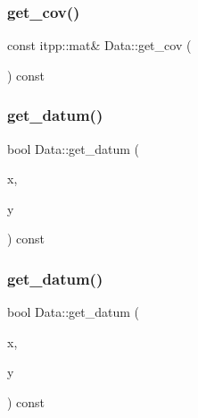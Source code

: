 \mbox{\label{classData_a19b920edbea6526f6db747bfe1c4c1c2}} 
\subsubsection{\texorpdfstring{get\_cov()}{get\_cov()}\hspace{0.1cm}{\footnotesize\ttfamily [2/2]}}
{\footnotesize\ttfamily const itpp\+::mat\& Data\+::get\+\_\+cov (\begin{DoxyParamCaption}{ }\end{DoxyParamCaption}) const\hspace{0.3cm}{\ttfamily [inline]}}

\mbox{\label{classData_ad7e50542712441af6ad2a227193a777f}} 
\subsubsection{\texorpdfstring{get\_datum()}{get\_datum()}\hspace{0.1cm}{\footnotesize\ttfamily [1/4]}}
{\footnotesize\ttfamily bool Data\+::get\+\_\+datum (\begin{DoxyParamCaption}\item[{\mbox{\hyperlink{classAbscissa}{Abscissa}} $\ast$}]{x,  }\item[{Ensem\+Real \&}]{y }\end{DoxyParamCaption}) const}

\mbox{\label{classData_ad7e50542712441af6ad2a227193a777f}} 
\subsubsection{\texorpdfstring{get\_datum()}{get\_datum()}\hspace{0.1cm}{\footnotesize\ttfamily [2/4]}}
{\footnotesize\ttfamily bool Data\+::get\+\_\+datum (\begin{DoxyParamCaption}\item[{\mbox{\hyperlink{classAbscissa}{Abscissa}} $\ast$}]{x,  }\item[{Ensem\+Real \&}]{y }\end{DoxyParamCaption}) const}

